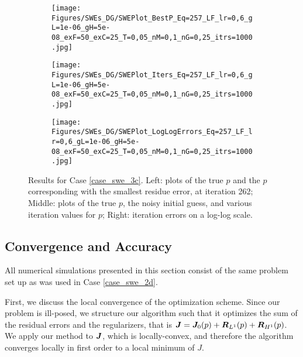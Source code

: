 \begin{figure}[H]
    \begin{subfigure}[t]{0.32\textwidth}
        \centering
        \texttt{[image: Figures/SWEs\_DG/SWEPlot\_BestP\_Eq=257\_LF\_lr=0,6\_gL=1e-06\_gH=5e-08\_exF=50\_exC=25\_T=0,05\_nM=0,1\_nG=0,25\_itrs=1000.jpg]}
    \end{subfigure}
    \begin{subfigure}[t]{0.32\textwidth}
        \centering
        \texttt{[image: Figures/SWEs\_DG/SWEPlot\_Iters\_Eq=257\_LF\_lr=0,6\_gL=1e-06\_gH=5e-08\_exF=50\_exC=25\_T=0,05\_nM=0,1\_nG=0,25\_itrs=1000.jpg]}
    \end{subfigure}
    \begin{subfigure}[t]{0.32\textwidth}
        \texttt{[image: Figures/SWEs\_DG/SWEPlot\_LogLogErrors\_Eq=257\_LF\_lr=0,6\_gL=1e-06\_gH=5e-08\_exF=50\_exC=25\_T=0,05\_nM=0,1\_nG=0,25\_itrs=1000.jpg]}
    \end{subfigure}
    \caption{Results for Case \eqref{case_swe_3c}. Left: plots of the true $p$ and the $p$ corresponding with the smallest residue error, at iteration 262; Middle: plots of the true $p$, the noisy initial guess, and various iteration values for $p$; Right: iteration errors on a log-log scale.}
    \label{fig:swe_3C}
\end{figure}

\subsection{Convergence and Accuracy}
 All numerical simulations presented in this section consist of the same problem set up as was used in Case \eqref{case_swe_2d}.

First, we discuss the local convergence of the optimization scheme. Since our problem is ill-posed, we structure our algorithm such that it optimizes the sum of the residual errors and the regularizers, that is $\bm{J} = \bm{J}_0(p) + \bm{R}_{L^1}(p) + \bm{R}_{H^1}(p)$. We apply our method to $\bm{J}$, which is locally-convex, and therefore the algorithm converges locally in first order to a local minimum of $J$. 

